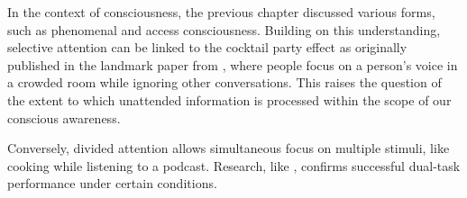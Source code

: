 \documentclass[10pt]{article}
\begin{document}
\begin{sloppypar}
  In the context of consciousness, the previous chapter discussed various forms, such as phenomenal and access consciousness. Building on this understanding, selective attention can be linked to the cocktail party effect as originally published in the landmark paper from \cite{cherry_experiments_1953}, where people focus on a person’s voice in a crowded room while ignoring other conversations. This raises the question of the extent to which unattended information is processed within the scope of our conscious awareness.

  Conversely, divided attention allows simultaneous focus on multiple stimuli, like cooking while listening to a podcast. Research, like \cite{rodrigue_spatio-temporal_2015}, confirms successful dual-task performance under certain conditions.

  \vspace{10pt} %
  \begin{table}[ht]
    \centering
    \renewcommand{\arraystretch}{1.5}
    \setlength{\tabcolsep}{12pt}
    \caption{Two major types of attention and their descriptions.}
    \label{tab:overview-attention}
  \end{table}


\end{sloppypar}
\end{document}

